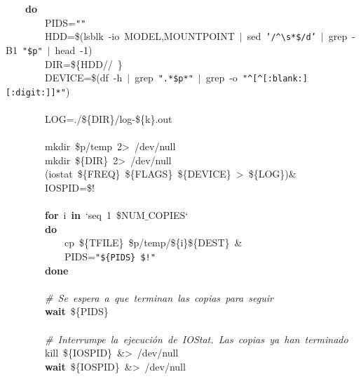 \mbox{}\ \ \ \ \textbf{do} \\
\mbox{}\ \ \ \ \ \ \ \ PIDS=\texttt{"{}"{}} \\
\mbox{}\ \ \ \ \ \ \ \ HDD=\$(lsblk\ -io\ MODEL,MOUNTPOINT\ $|$\ sed\ \texttt{'/\textasciicircum{}}\texttt{\textbackslash{}s}\texttt{*\$/d'}\ $|$\ grep\ -B1\ \texttt{"{}\$p"{}}\ $|$\ head\ -1) \\
\mbox{}\ \ \ \ \ \ \ \ DIR=\$\{HDD//\ \} \\
\mbox{}\ \ \ \ \ \ \ \ DEVICE=\$(df\ -h\ $|$\ grep\ \texttt{"{}.*\$p*"{}}\ $|$\ grep\ -o\ \texttt{"{}\textasciicircum{}[\textasciicircum{}[:blank:][:digit:]]*"{}}) \\
\mbox{}\ \ \ \ \ \ \ \  \\
\mbox{}\ \ \ \ \ \ \ \ LOG=./\$\{DIR\}/log-\$\{k\}.out \\
\mbox{} \\
\mbox{}\ \ \ \ \ \ \ \ mkdir\ \$p/temp\ 2\textgreater{}\ /dev/null \\
\mbox{}\ \ \ \ \ \ \ \ mkdir\ \$\{DIR\}\ 2\textgreater{}\ /dev/null \\
\mbox{}\ \ \ \ \ \ \ \ (iostat\ \$\{FREQ\}\ \$\{FLAGS\}\ \$\{DEVICE\}\ \textgreater{}\ \$\{LOG\})\& \\
\mbox{}\ \ \ \ \ \ \ \ IOSPID=\$! \\
\mbox{}\ \ \ \ \ \ \ \  \\
\mbox{}\ \ \ \ \ \ \ \ \textbf{for}\ i\ \textbf{in}\ `seq\ 1\ \$NUM$\_$COPIES` \\
\mbox{}\ \ \ \ \ \ \ \ \textbf{do} \\
\mbox{}\ \ \ \ \ \ \ \ \ \ \ \ cp\ \$\{TFILE\}\ \$p/temp/\$\{i\}\$\{DEST\}\ \& \\
\mbox{}\ \ \ \ \ \ \ \ \ \ \ \ PIDS=\texttt{"{}\$\{PIDS\}\ \$!"{}} \\
\mbox{}\ \ \ \ \ \ \ \ \textbf{done} \\
\mbox{} \\
\mbox{}\ \ \ \ \ \ \ \ \textit{\#\ Se\ espera\ a\ que\ terminan\ las\ copias\ para\ seguir} \\
\mbox{}\ \ \ \ \ \ \ \ \textbf{wait}\ \$\{PIDS\} \\
\mbox{} \\
\mbox{}\ \ \ \ \ \ \ \ \textit{\#\ Interrumpe\ la\ ejecución\ de\ IOStat.\ Las\ copias\ ya\ han\ terminado} \\
\mbox{}\ \ \ \ \ \ \ \ kill\ \$\{IOSPID\}\ \&\textgreater{}\ /dev/null \\
\mbox{}\ \ \ \ \ \ \ \ \textbf{wait}\ \$\{IOSPID\}\ \&\textgreater{}\ /dev/null \\
